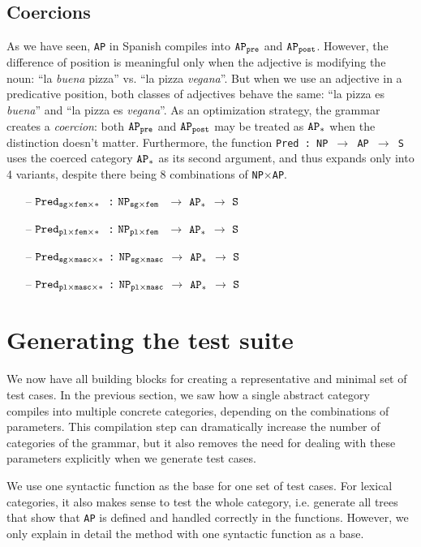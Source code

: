 \documentclass[11pt]{article}
\def\t#1{\texttt{#1}}
\newcommand{\quality}[1]{${\tt AP_{#1}}$}
\newcommand{\comment}{${\tt S}$}
\newcommand{\pred}[3]{${\tt Pred_{#1\times#2\times#3}}$}
\newcommand{\itemSpa}[2]{${\tt NP_{#1\times#2}}$}
\begin{document}
\subsection{Coercions}
\label{sec:Coercions}
As we have seen, \t{AP} in Spanish compiles into \quality{pre} and
\quality{post}. However, the difference of position is meaningful only when the
adjective is modifying the noun: ``la \emph{buena} pizza'' vs. ``la pizza
\emph{vegana}''. But when we use an adjective in a predicative position, both
classes of adjectives behave the same: ``la pizza es \emph{buena}''
and ``la pizza es \emph{vegana}''. As an optimization strategy, the
grammar creates a {\it coercion}: both \quality{pre} and \quality{post}
may be treated as \quality{*} when the distinction doesn't matter. 
Furthermore, the function \t{Pred : NP $\rightarrow$ AP $\rightarrow$ S} uses
the coerced category \quality{*} as its second argument, and thus
expands only into 4 variants, despite there being 8 combinations of
\t{NP}$\times$\t{AP}.

\begin{itemize}
\setlength\itemsep{0em}
\item[--] \pred{sg}{fem}{*~} \t{:} \itemSpa{sg}{fem~} $\rightarrow$ \quality{*} $\rightarrow$ \comment
\item[--]  \pred{pl}{fem}{*~} \t{:} \itemSpa{pl}{fem~} $\rightarrow$ \quality{*} $\rightarrow$ \comment
\item[--]  \pred{sg}{masc}{*} \t{:} \itemSpa{sg}{masc} $\rightarrow$ \quality{*} $\rightarrow$ \comment
\item[--] \pred{pl}{masc}{*} \t{:} \itemSpa{pl}{masc} $\rightarrow$ \quality{*} $\rightarrow$ \comment
\end{itemize}

\section{Generating the test suite}
\label{sec:testing}

We now have all building blocks for creating a representative and
minimal set of test cases.
In the previous section, we saw how a single abstract category
compiles into multiple concrete categories, depending on the
combinations of parameters. This compilation step can dramatically
increase the number of categories of the grammar, but it also removes
the need for dealing with these parameters explicitly when we generate
test cases. 

We use one syntactic function as the base for one set of test
cases. For lexical categories, it also makes sense to test the whole
category, i.e. generate all trees that show that \t{AP} is defined and
handled correctly in the functions. However, we only explain in detail
the method with one syntactic function as a base.
\end{document}
